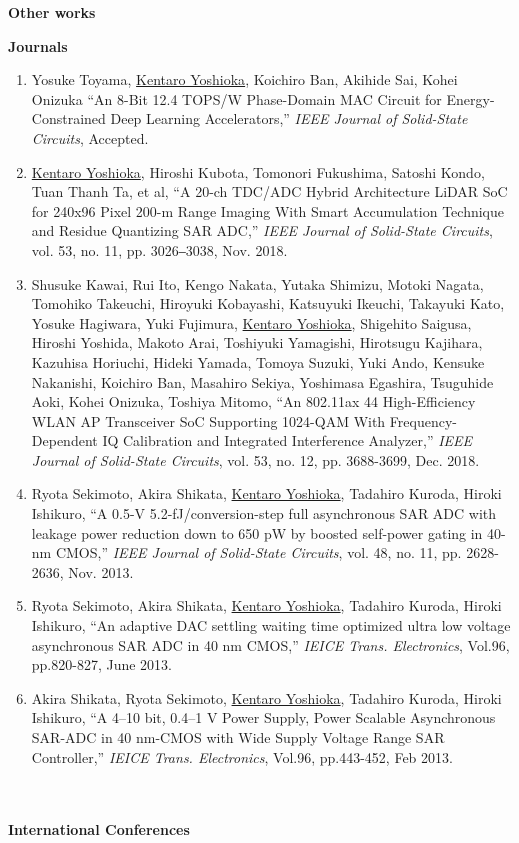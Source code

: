 \large{\textbf{Other works}}

\large{\textbf{Journals}}
\normalsize

\begin{enumerate}
\item	Yosuke Toyama, \underline{Kentaro Yoshioka}, Koichiro Ban, Akihide Sai, Kohei Onizuka “An 8-Bit 12.4 TOPS/W Phase-Domain MAC Circuit for Energy-Constrained Deep Learning Accelerators,” \textit{IEEE Journal of Solid-State Circuits}, Accepted.

\item	\underline{Kentaro Yoshioka}, Hiroshi Kubota, Tomonori Fukushima, Satoshi Kondo, Tuan Thanh Ta, et al, “A 20-ch TDC/ADC Hybrid Architecture LiDAR SoC for 240x96 Pixel 200-m Range Imaging With Smart Accumulation Technique and Residue Quantizing SAR ADC,” \textit{IEEE Journal of Solid-State Circuits}, vol. 53, no. 11, pp. 3026‒3038, Nov. 2018.

\item	Shusuke Kawai, Rui Ito, Kengo Nakata, Yutaka Shimizu, Motoki Nagata, Tomohiko Takeuchi, Hiroyuki Kobayashi, Katsuyuki Ikeuchi, Takayuki Kato, Yosuke Hagiwara, Yuki Fujimura, \underline{Kentaro Yoshioka}, Shigehito Saigusa, Hiroshi Yoshida, Makoto Arai, Toshiyuki Yamagishi, Hirotsugu Kajihara, Kazuhisa Horiuchi, Hideki Yamada, Tomoya Suzuki, Yuki Ando, Kensuke Nakanishi, Koichiro Ban, Masahiro Sekiya, Yoshimasa Egashira, Tsuguhide Aoki, Kohei Onizuka, Toshiya Mitomo, “An 802.11ax 44 High-Efficiency WLAN AP Transceiver SoC Supporting 1024-QAM With Frequency-Dependent IQ Calibration and Integrated Interference Analyzer,” \textit{IEEE Journal of Solid-State Circuits}, vol. 53, no. 12, pp. 3688-3699, Dec. 2018.

\item	Ryota Sekimoto, Akira Shikata, \underline{Kentaro Yoshioka}, Tadahiro Kuroda, Hiroki Ishikuro, “A 0.5-V 5.2-fJ/conversion-step full asynchronous SAR ADC with leakage power reduction down to 650 pW by boosted self-power gating in 40-nm CMOS,” \textit{IEEE Journal of Solid-State Circuits}, vol. 48, no. 11, pp. 2628-2636, Nov. 2013.

\item	Ryota Sekimoto, Akira Shikata, \underline{Kentaro Yoshioka}, Tadahiro Kuroda, Hiroki Ishikuro, “An adaptive DAC settling waiting time optimized ultra low voltage asynchronous SAR ADC in 40 nm CMOS,” \textit{IEICE Trans. Electronics}, Vol.96, pp.820-827, June 2013.

\item	Akira Shikata, Ryota Sekimoto, \underline{Kentaro Yoshioka}, Tadahiro Kuroda, Hiroki Ishikuro, “A 4–10 bit, 0.4–1 V Power Supply, Power Scalable Asynchronous SAR-ADC in 40 nm-CMOS with Wide Supply Voltage Range SAR Controller,” \textit{IEICE Trans. Electronics}, Vol.96, pp.443-452, Feb 2013.
\end{enumerate}
\\
\\
\large{\textbf{International Conferences}}
\normalsize

